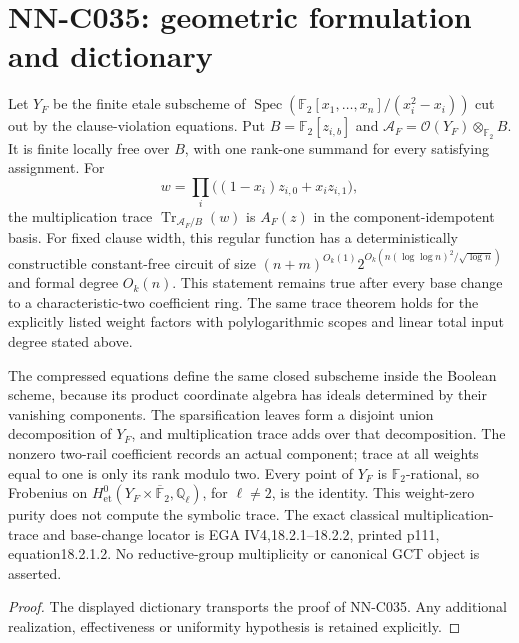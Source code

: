 \section{NN-C035: geometric formulation and dictionary}
\begin{geometricstatement}[NN-C035]
Let $Y_F$ be the finite etale subscheme of $\operatorname{Spec}(\mathbb F_2[x_1,\ldots,x_n]/(x_i^2-x_i))$ cut out by the clause-violation equations. Put $B=\mathbb F_2[z_{i,b}]$ and $\mathscr A_F=\mathcal O(Y_F)\otimes_{\mathbb F_2}B$. It is finite locally free over $B$, with one rank-one summand for every satisfying assignment. For
\[
                           w=\prod_i\bigl((1-x_i)z_{i,0}+x_i z_{i,1}\bigr),
\]
the multiplication trace $\operatorname{Tr}_{\mathscr A_F/B}(w)$ is $A_F(z)$ in the component-idempotent basis. For fixed clause width, this regular function has a deterministically constructible constant-free circuit of size $(n+m)^{O_k(1)}2^{O_k(n(\log\log n)^2/\sqrt{\log n})}$ and formal degree $O_k(n)$. This statement remains true after every base change to a characteristic-two coefficient ring. The same trace theorem holds for the explicitly listed weight factors with polylogarithmic scopes and linear total input degree stated above.

The compressed equations define the same closed subscheme inside the Boolean scheme, because its product coordinate algebra has ideals determined by their vanishing components. The sparsification leaves form a disjoint union decomposition of $Y_F$, and multiplication trace adds over that decomposition. The nonzero two-rail coefficient records an actual component; trace at all weights equal to one is only its rank modulo two. Every point of $Y_F$ is $\mathbb F_2$-rational, so Frobenius on $H^0_{\mathrm{et}}(Y_F\times\overline{\mathbb F}_2,\mathbb Q_\ell)$, for $\ell\ne2$, is the identity. This weight-zero purity does not compute the symbolic trace. The exact classical multiplication-trace and base-change locator is EGA IV4,18.2.1--18.2.2, printed p111, equation18.2.1.2. No reductive-group multiplicity or canonical GCT object is asserted.
\end{geometricstatement}
\begin{proof} The displayed dictionary transports the proof of NN-C035. Any additional realization, effectiveness or uniformity hypothesis is retained explicitly.\end{proof}


